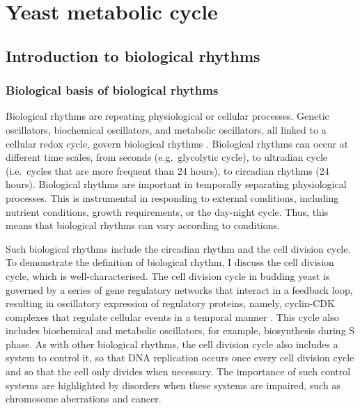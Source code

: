 \section{Yeast metabolic cycle}
\label{sec:intro-ymc}

\subsection{Introduction to biological rhythms}
\label{subsec:intro-ymc-biological_rhythms}

\subsubsection{Biological basis of biological rhythms}
\label{subsubsec:intro-ymc-biological_rhythms-biological_basis}


Biological rhythms are repeating physiological or cellular processes.
Genetic oscillators, biochemical oscillators, and metabolic oscillators, all linked to a cellular redox cycle, govern biological rhythms \citep{mellorMolecularBasisMetabolic2016}.
Biological rhythms can occur at different time scales, from seconds (e.g.\ glycolytic cycle), to ultradian cycle (i.e.\ cycles that are more frequent than 24 hours), to circadian rhythms (24 hours).
Biological rhythms are important in temporally separating physiological processes.
This is instrumental in responding to external conditions, including nutrient conditions, growth requirements, or the day-night cycle.
Thus, this means that biological rhythms can vary according to conditions.

Such biological rhythms include the circadian rhythm and the cell division cycle.
To demonstrate the definition of biological rhythm, I discuss the cell division cycle, which is well-characterised.
The cell division cycle in budding yeast is governed by a series of gene regulatory networks that interact in a feedback loop, resulting in oscillatory expression of regulatory proteins, namely, cyclin-CDK complexes that regulate cellular events in a temporal manner \citep{adlerYeastCellCycle2022, orlandoGlobalControlCellcycle2008, murrayRecyclingCellCycle2004}.
This cycle also includes biochemical and metabolic oscillators, for example, biosynthesis during S phase.
As with other biological rhythms, the cell division cycle also includes a system to control it, so that DNA replication occurs once every cell division cycle and so that the cell only divides when necessary.
The importance of such control systems are highlighted by disorders when these systems are impaired, such as chromosome aberrations and cancer.

